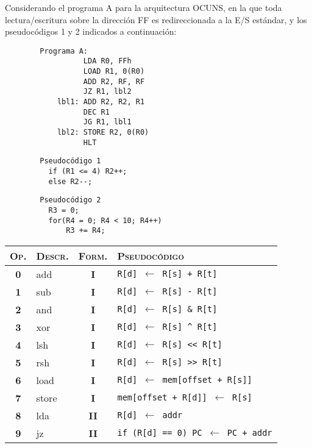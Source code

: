 \documentclass[12pt,a4paper]{article}
\begin{document}
 Considerando el programa A para la arquitectura OCUNS, en la que toda lectura/escritura sobre la dirección FF es redireccionada a la E/S estándar, y los pseudocódigos 1 y 2 indicados a continuación: \\ [2.5mm]
\begin{small}
	\begin{minipage}{.4\textwidth}
		\begin{verbatim}
		Programa A:
			      LDA R0, FFh
			      LOAD R1, 0(R0)
			      ADD R2, RF, RF
			      JZ R1, lbl2
			lbl1: ADD R2, R2, R1
			      DEC R1
			      JG R1, lbl1
			lbl2: STORE R2, 0(R0)
			      HLT
		\end{verbatim}
		\begin{verbatim}
		Pseudocódigo 1
		  if (R1 <= 4) R2++;
		  else R2--;
		\end{verbatim}
		\begin{verbatim}
		Pseudocódigo 2
		  R3 = 0;
		  for(R4 = 0; R4 < 10; R4++)
		      R3 += R4;
		\end{verbatim}
	\end{minipage}
	\begin{minipage}{.6\textwidth}	
		\begin{tabular}{|c|l|c|l|}\hline
			\textsc{Op.} & \textsc{Descr.} & \textsc{Form.} & \textsc{Pseudocódigo} \\ \hline
			\textbf{0} & \textsf{add} & \textbf{I} & \texttt{R[d] $\leftarrow$ R[s] + R[t]} \\
			\textbf{1} & \textsf{sub} & \textbf{I} & \texttt{R[d] $\leftarrow$ R[s] - R[t]} \\
			\textbf{2} & \textsf{and} & \textbf{I} & \texttt{R[d] $\leftarrow$ R[s] \& R[t]} \\
			\textbf{3} & \textsf{xor} & \textbf{I} & \texttt{R[d] $\leftarrow$ R[s] \^{} R[t]} \\
			\textbf{4} & \textsf{lsh} & \textbf{I} & \texttt{R[d] $\leftarrow$ R[s] <{}<{} R[t]} \\
			\textbf{5} & \textsf{rsh}  & \textbf{I} & \texttt{R[d] $\leftarrow$ R[s] >{}>{} R[t]} \\
			\textbf{6} & \textsf{load}  & \textbf{I} & \texttt{R[d] $\leftarrow$ mem[offset + R[s]]} \\
			\textbf{7} & \textsf{store} & \textbf{I} & \texttt{mem[offset + R[d]] $\leftarrow$ R[s]} \\
			\textbf{8} & \textsf{lda}   & \textbf{II} & \texttt{R[d] $\leftarrow$ addr} \\
			\textbf{9} & \textsf{jz}    & \textbf{II} & \texttt{if (R[d] == 0) PC $\leftarrow$ PC + addr} \\

\end{tabular}
\end{minipage}
\end{small}
\end{document}
